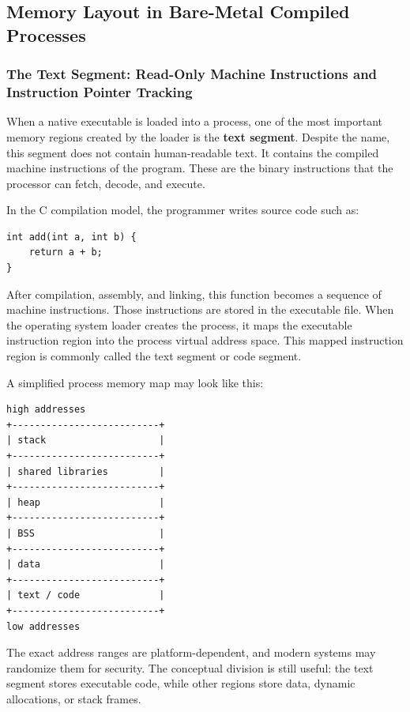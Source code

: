\subsection{Memory Layout in Bare-Metal Compiled Processes}


\subsubsection{The Text Segment: Read-Only Machine Instructions and Instruction Pointer Tracking}

When a native executable is loaded into a process, one of the most important memory regions created by the loader is the \textbf{text segment}. Despite the name, this segment does not contain human-readable text. It contains the compiled machine instructions of the program. These are the binary instructions that the processor can fetch, decode, and execute.

In the C compilation model, the programmer writes source code such as:

\begin{verbatim}
int add(int a, int b) {
    return a + b;
}
\end{verbatim}

After compilation, assembly, and linking, this function becomes a sequence of machine instructions. Those instructions are stored in the executable file. When the operating system loader creates the process, it maps the executable instruction region into the process virtual address space. This mapped instruction region is commonly called the text segment or code segment.

A simplified process memory map may look like this:

\begin{verbatim}
high addresses
+--------------------------+
| stack                    |
+--------------------------+
| shared libraries         |
+--------------------------+
| heap                     |
+--------------------------+
| BSS                      |
+--------------------------+
| data                     |
+--------------------------+
| text / code              |
+--------------------------+
low addresses
\end{verbatim}

The exact address ranges are platform-dependent, and modern systems may randomize them for security. The conceptual division is still useful: the text segment stores executable code, while other regions store data, dynamic allocations, or stack frames.

